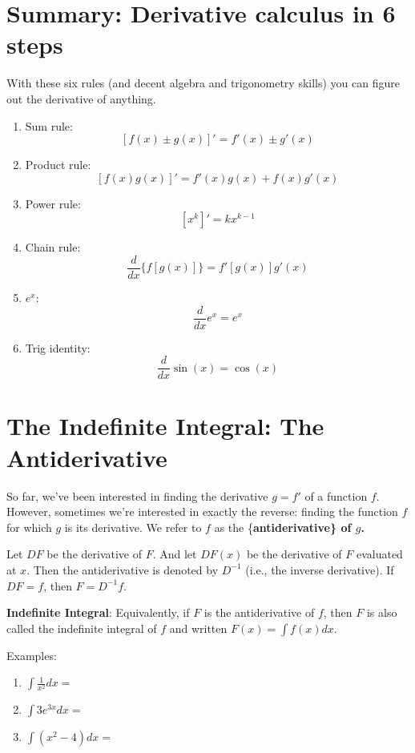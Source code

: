\documentclass[]{book}
\providecommand{\tightlist}{%
  \setlength{\itemsep}{0pt}\setlength{\parskip}{0pt}}
\theoremstyle{definition}
\theoremstyle{definition}
\theoremstyle{definition}
\theoremstyle{remark}
\begin{document}
\section{Summary: Derivative calculus in 6
steps}\label{summary-derivative-calculus-in-6-steps}

With these six rules (and decent algebra and trigonometry skills) you
can figure out the derivative of anything.

\begin{enumerate}
\def\labelenumi{\arabic{enumi}.}
\tightlist
\item
  Sum rule: \[[f(x)\pm g(x)]' = f'(x)\pm g'(x)\]
\item
  Product rule: \[[f(x)g(x)]' = f'(x)g(x)+f(x)g'(x)\]
\item
  Power rule: \[[x^k]' = k x^{k-1}\]
\item
  Chain rule: \[\frac{d}{dx} \{ f[g(x)] \} = f'[g(x)] g'(x)\]
\item
  \(e^x\): \[\frac{d}{dx} e^x = e^x\]
\item
  Trig identity: \[\frac{d}{dx} \sin(x) = \cos(x)\]
\end{enumerate}

\section{The Indefinite Integral: The
Antiderivative}\label{the-indefinite-integral-the-antiderivative}

So far, we've been interested in finding the derivative \(g=f'\) of a
function \(f\). However, sometimes we're interested in exactly the
reverse: finding the function \(f\) for which \(g\) is its derivative.
We refer to \(f\) as the \{\bf antiderivative\} of \(g\).

Let \(DF\) be the derivative of \(F\). And let \(DF(x)\) be the
derivative of \(F\) evaluated at \(x\). Then the antiderivative is
denoted by \(D^{-1}\) (i.e., the inverse derivative). If \(DF=f\), then
\(F=D^{-1}f\).

\textbf{Indefinite Integral}: Equivalently, if \(F\) is the
antiderivative of \(f\), then \(F\) is also called the indefinite
integral of \(f\) and written \(F(x)=\int\limits f(x)dx\).

\begin{framed}
Examples:
    \parbox[c]{3.75in}{
    \begin{enumerate}
        \item $\int\limits \frac{1}{x^2}dx=$
        \item $\int\limits 3e^{3x}dx=$
        \item $\int\limits (x^2-4) dx=$
    \end{enumerate}}

\end{framed}
\end{document}
